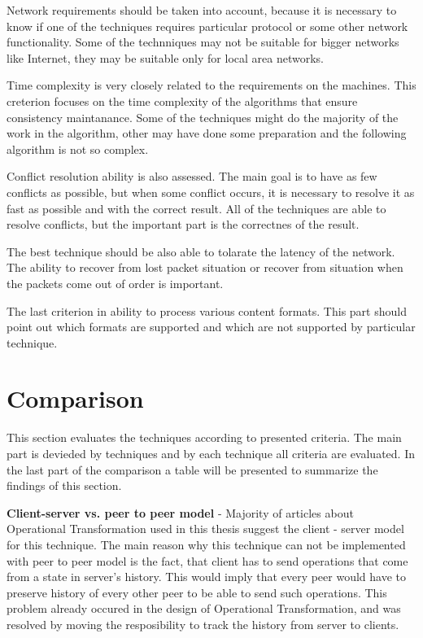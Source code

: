 \documentclass[12pt,oneside]{fithesis2}
\begin{document}
\par Network requirements should be taken into account, because it is necessary to know if one of the techniques requires particular protocol or some other network functionality. Some of the technniques may not be suitable for bigger networks like Internet, they may be suitable only for local area networks.
\par Time complexity is very closely related to the requirements on the machines. This creterion focuses on the time complexity of the algorithms that ensure consistency maintanance. Some of the techniques might do the majority of the work in the algorithm, other may have done some preparation and the following algorithm is not so complex.
\par Conflict resolution ability is also assessed. The main goal is to have as few conflicts as possible, but when some conflict occurs, it is necessary to resolve it as fast as possible and with the correct result. All of the techniques are able to resolve conflicts, but the important part is the correctnes of the result. 
\par The best technique should be also able to tolarate the latency of the network. The ability to recover from lost packet situation or recover from situation when the packets come out of order is important. 
\par The last criterion in ability to process various content formats. This part should point out which formats are supported and which are not supported by particular technique.
\section{Comparison}
\par This section evaluates the techniques according to presented criteria. The main part is devieded by techniques and by each technique all criteria are evaluated. In the last part of the comparison a table will be presented to summarize the findings of this section.
\\
\par \textbf{\underline{}}

\vspace{3mm}

\textbf{Client-server vs. peer to peer model} - Majority of articles about Operational Transformation used in this thesis suggest the client - server model for this technique. The main reason why this technique can not be implemented with peer to peer model is the fact, that client has to send operations that come from a state in server's history. This would imply that every peer would have to preserve history of every other peer to be able to send such operations. This problem already occured in the design of Operational Transformation, and was resolved by moving the resposibility to track the history from server to clients.
\end{document}
